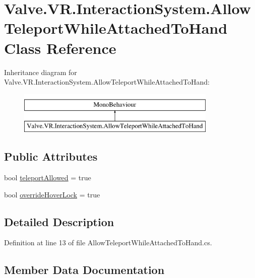\hypertarget{class_valve_1_1_v_r_1_1_interaction_system_1_1_allow_teleport_while_attached_to_hand}{}\section{Valve.\+V\+R.\+Interaction\+System.\+Allow\+Teleport\+While\+Attached\+To\+Hand Class Reference}
\label{class_valve_1_1_v_r_1_1_interaction_system_1_1_allow_teleport_while_attached_to_hand}
Inheritance diagram for Valve.\+V\+R.\+Interaction\+System.\+Allow\+Teleport\+While\+Attached\+To\+Hand\+:\begin{figure}[H]
\begin{center}
\leavevmode
\includegraphics[height=2.000000cm]{class_valve_1_1_v_r_1_1_interaction_system_1_1_allow_teleport_while_attached_to_hand}
\end{center}
\end{figure}
\subsection*{Public Attributes}
\begin{DoxyCompactItemize}
\item 
bool \mbox{\hyperlink{class_valve_1_1_v_r_1_1_interaction_system_1_1_allow_teleport_while_attached_to_hand_a0b4bb44373b1273e58ea29e700b3c479}{teleport\+Allowed}} = true
\item 
bool \mbox{\hyperlink{class_valve_1_1_v_r_1_1_interaction_system_1_1_allow_teleport_while_attached_to_hand_a6f0746ef884a0b5a80460a01d0e47d66}{override\+Hover\+Lock}} = true
\end{DoxyCompactItemize}


\subsection{Detailed Description}


Definition at line 13 of file Allow\+Teleport\+While\+Attached\+To\+Hand.\+cs.



\subsection{Member Data Documentation}
\mbox{\label{class_valve_1_1_v_r_1_1_interaction_system_1_1_allow_teleport_while_attached_to_hand_a6f0746ef884a0b5a80460a01d0e47d66}} 
